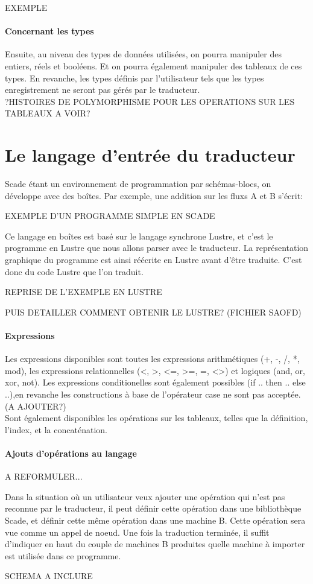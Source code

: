 EXEMPLE


\paragraph{Concernant les types}
Ensuite, au niveau des types de données utilisées, on pourra manipuler
des entiers, réels et booléens. Et on pourra également manipuler des
tableaux de ces types. En revanche, les types définis par
l'utilisateur tels que les types enregistrement ne seront pas gérés
par le traducteur.\\

?HISTOIRES DE POLYMORPHISME POUR LES OPERATIONS SUR LES TABLEAUX A VOIR?


\section{Le langage d'entrée du traducteur}

Scade étant un environnement de programmation par schémas-blocs, on
développe avec des boîtes. Par exemple, une addition sur les fluxs A
et B s'écrit:

EXEMPLE D'UN PROGRAMME SIMPLE EN SCADE

Ce langage en boîtes est basé sur le langage synchrone Lustre, et
c'est le programme en Lustre que nous allons parser avec le
traducteur. La représentation graphique du programme est ainsi
réécrite en Lustre avant d'être traduite. C'est donc du code Lustre
que l'on traduit. 

REPRISE DE L'EXEMPLE EN LUSTRE

PUIS DETAILLER COMMENT OBTENIR LE LUSTRE?
(FICHIER SAOFD)

\paragraph{Expressions}
Les expressions disponibles sont toutes les expressions arithmétiques
(+, -, /, *, mod), les expressions relationnelles (<, >, <=, >=, =, <>)
et logiques (and, or, xor, not).
Les expressions conditionelles sont également possibles (if .. then
.. else ..),en revanche les constructions à base de l'opérateur case
ne sont pas acceptée. (A AJOUTER?) \\
Sont également disponibles les opérations sur les tableaux, telles que
la définition, l'index, et la concaténation.


\paragraph{Ajouts d'opérations au langage}

A REFORMULER...

Dans la situation où un utilisateur veux ajouter une opération qui
n'est pas reconnue par le traducteur, il peut définir cette opération
dans une bibliothèque Scade, et définir cette même opération dans une
machine B. Cette opération sera vue comme un appel de noeud.
Une fois la traduction terminée, il suffit d'indiquer en
haut du couple de machines B produites quelle machine à importer est
utilisée dans ce programme.

SCHEMA A INCLURE

